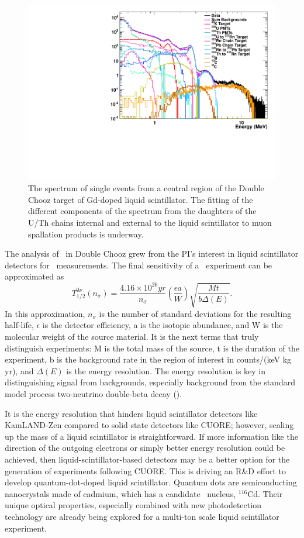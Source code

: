\begin{figure}
\begin{center}
\includegraphics[width=0.58\columnwidth]{prettySpectrum_17July2012.pdf} 
\end{center}
\caption{\label{dcSpec} The spectrum of single events from a central region of the Double Chooz target of Gd-doped liquid scintillator. The fitting of the different components of the spectrum from the daughters of the U/Th chains internal and external to the liquid scintillator to muon spallation products is underway.}
\end{figure}

The analysis of \zeronu~in Double Chooz grew from the PI's interest in liquid scintillator detectors for  \zeronu~measurements. The final sensitivity of a \zeronu~experiment can be approximated as\cite{sens0nu}
\begin{equation}
\label{sens0nu}
T_{1/2}^{0\nu}(n_\sigma) = \frac{4.16\times 10^{26} yr}{n_\sigma} \left ( \frac{\epsilon a}{W} \right ) \sqrt{ \frac{Mt}{b\Delta(E)}}.
\end{equation}
In this approximation, $n_\sigma$ is the number of standard deviations for the resulting half-life, $\epsilon$ is the detector efficiency, a is the isotopic abundance, and W is the molecular weight of the source material. It is the next terms that truly distinguish experiments: M is the total mass of the source, t is the duration of the experiment, b is the background rate in the region of interest in counts/(keV kg yr), and $\Delta(E)$ is the energy resolution. The energy resolution is key in distinguishing signal from backgrounds, especially background from the standard model process two-neutrino double-beta decay  (\twonu).

It is the energy resolution that hinders liquid scintillator detectors like KamLAND-Zen compared to solid state detectors like CUORE; however, scaling up the mass of a liquid scintillator is straightforward. If more information like the direction of the outgoing electrons or simply better energy resolution could be achieved, then liquid-scintillator-based detectors may be a better option for the generation of experiments following CUORE. This is driving an R\&D effort to develop quantum-dot-doped liquid scintillator. Quantum dots are semiconducting nanocrystals made of cadmium, which has a candidate \zeronu~nucleus, $^{116}$Cd. Their unique optical properties, especially combined with new photodetection technology are already being explored for a multi-ton scale liquid scintillator experiment\cite{qdot}. 

